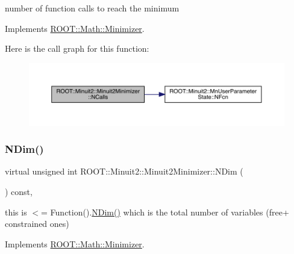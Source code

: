 number of function calls to reach the minimum 



Implements \mbox{\hyperlink{classROOT_1_1Math_1_1Minimizer_abf8b2e97d47843a1fde7a54cb51c1f0e}{R\+O\+O\+T\+::\+Math\+::\+Minimizer}}.

Here is the call graph for this function\+:
\nopagebreak
\begin{figure}[H]
\begin{center}
\leavevmode
\includegraphics[width=350pt]{d0/d9c/classROOT_1_1Minuit2_1_1Minuit2Minimizer_ab5faf7c3dc0b3743eee8352c62a6ccfd_cgraph}
\end{center}
\end{figure}
\mbox{\label{classROOT_1_1Minuit2_1_1Minuit2Minimizer_a6ed2c7d99296e222f0f43295e302eb9e}} 
\subsubsection{\texorpdfstring{NDim()}{NDim()}\hspace{0.1cm}{\footnotesize\ttfamily [1/3]}}
{\footnotesize\ttfamily virtual unsigned int R\+O\+O\+T\+::\+Minuit2\+::\+Minuit2\+Minimizer\+::\+N\+Dim (\begin{DoxyParamCaption}{ }\end{DoxyParamCaption}) const\hspace{0.3cm}{\ttfamily [inline]}, {\ttfamily [virtual]}}

this is $<$= Function().\mbox{\hyperlink{classROOT_1_1Minuit2_1_1Minuit2Minimizer_a6ed2c7d99296e222f0f43295e302eb9e}{N\+Dim()}} which is the total number of variables (free+ constrained ones) 

Implements \mbox{\hyperlink{classROOT_1_1Math_1_1Minimizer_aecb9b9ee5c6a9fd7db3196ae3ac5e335}{R\+O\+O\+T\+::\+Math\+::\+Minimizer}}.

\mbox{\label{classROOT_1_1Minuit2_1_1Minuit2Minimizer_a6ed2c7d99296e222f0f43295e302eb9e}} 
